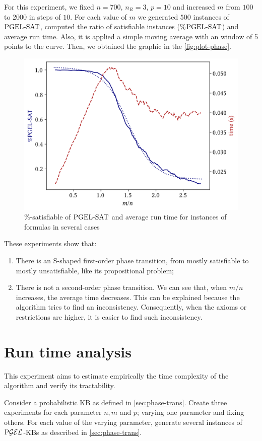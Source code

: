 For this experiment, we fixed $n = 700$, $n_R = 3$, $p = 10$ and increased $m$ from $100$ to $2000$ in steps of $10$. For each value of $m$ we generated $500$ instances of $\text{PGEL-SAT}$, computed the ratio of satisfiable instances (\%$\text{PGEL-SAT}$) and average run time. Also, it is applied a simple moving average with an window of 5 points to the curve.  Then, we obtained the graphic in the \autoref{fig:plot-phase}.

\begin{figure}[ht]
  \centering
  \includegraphics[width=.75\textwidth]{../img/plot-phase-trans}
  \caption{\%-satisfiable of $\text{PGEL-SAT}$ and average run time for instances of formulas in several cases}
  \label{fig:plot-phase}
\end{figure}
  

These experiments show that:
\begin{enumerate}[label=(\alph*)]
	\item There is an S-shaped first-order phase transition, from mostly satisfiable to mostly unsatisfiable, like its propositional problem;
	\item There is not a second-order phase transition. We can see that, when $m/n$ increases, the average time decreases. This can be explained because the algorithm tries to find an inconsistency. Consequently, when the axioms or restrictions are higher, it is easier to find such inconsistency.
\end{enumerate}

\section{Run time analysis}

This experiment aims to estimate empirically the time complexity of the algorithm and verify its tractability.

Consider a probabilistic KB as defined in \autoref{sec:phase-trans}. Create three experiments for each parameter $n, m$ and $p$; varying one parameter and fixing others. For each value of the varying parameter, generate several instances of $\text{P}\mathcal{GEL}$-KBs as described in \autoref{sec:phase-trans}.


